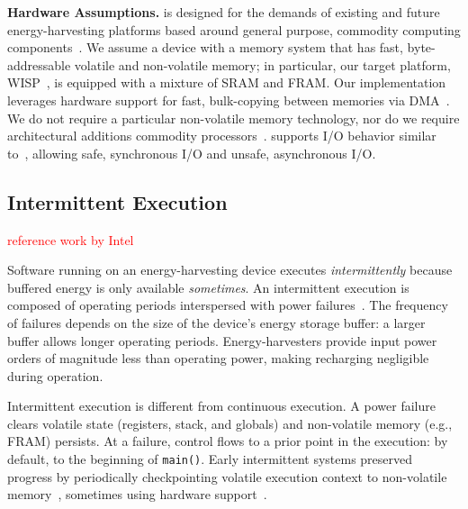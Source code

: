 \textbf{Hardware Assumptions.} \sys is designed for the demands of existing and future energy-harvesting platforms based around general purpose, commodity computing components~\cite{wisp,msp430datasheet}. We assume a device with a memory system that has fast, byte-addressable volatile and non-volatile memory; in particular, our target platform, WISP~\cite{wisp}, is equipped with a mixture of SRAM and FRAM. Our implementation leverages hardware support for fast, bulk-copying between memories via DMA~\cite{msp430datasheet}. We do not require a particular non-volatile memory technology, nor do we require architectural additions commodity processors~\cite{su_date_2017,ratchet,quickrecall,nvp}. \sys supports I/O behavior similar to~\cite{alpaca,chain}, allowing safe, synchronous I/O and unsafe, asynchronous I/O.

\subsection{Intermittent Execution}
\label{sec:background_consistency}

\textcolor{red}{reference work by Intel~\cite{baghsorkhi_cgo_2018}}

%
Software running on an energy-harvesting device executes {\em intermittently} because buffered energy is only available \emph{sometimes}. An intermittent execution is composed of operating periods interspersed with power failures~\cite{dino,chain,alpaca,ratchet}. The frequency of failures depends on the size of the device's energy storage buffer: a larger buffer allows longer operating periods. Energy-harvesters provide input power orders of magnitude less than operating power, making recharging negligible during operation.

Intermittent execution is different from continuous execution. A power failure clears volatile  state (registers, stack, and globals) and non-volatile memory (e.g., FRAM) persists. At a failure, control flows to a prior point in the execution: by default, to the beginning of {\tt main()}. Early intermittent systems preserved progress by periodically checkpointing volatile execution context to non-volatile memory~\cite{mementos,quickrecall}, sometimes using hardware support~\cite{mementos,mottola2017harvos,hibernusplusplus,hibernus,idetic}. 

